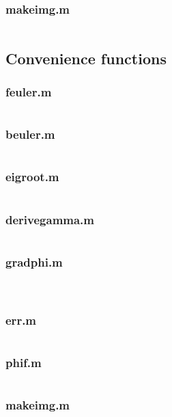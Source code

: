 \subsubsection*{makeimg.m}
\inputminted[linenos]{matlab}{makeimg.m}



\subsection*{Convenience functions}
\subsubsection*{feuler.m}
\inputminted[linenos]{matlab}{feuler.m}

\subsubsection*{beuler.m}
\inputminted[linenos]{matlab}{beuler.m}

\subsubsection*{eigroot.m}
\inputminted[linenos]{matlab}{eigroot.m}

\subsubsection*{derivegamma.m}
\inputminted[linenos]{matlab}{derivegamma.m}

\subsubsection*{gradphi.m}
\inputminted[linenos]{matlab}{gradphi.m}

\subsubsection*{}
\inputminted[linenos]{matlab}{gradW.m}

\subsubsection*{err.m}
\inputminted[linenos]{matlab}{err.m}

\subsubsection*{phif.m}
\inputminted[linenos]{matlab}{phif.m}

\subsubsection*{makeimg.m}
\inputminted[linenos]{matlab}{makeimg.m}




